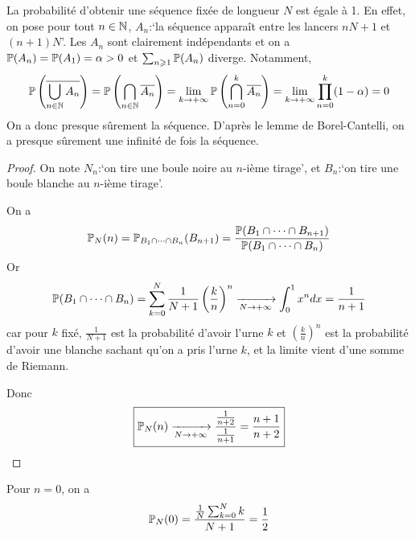 \begin{remark}
    La probabilité d'obtenir une séquence fixée de longueur $N$ est égale à 1. En effet, on pose pour tout $n\in\N$, $A_{n}$:`la séquence apparaît entre les lancers $nN+1$ et $(n+1)N$'. Les $A_{n}$ sont clairement indépendants et on a $\P(A_{n})=\P(A_{1})=\alpha>0$ et $\sum_{n\geqslant1}\P(A_{n})$ diverge. Notamment,
    \begin{equation}
        \P\left(\overline{\bigcup_{n\in\N}A_{n}}\right)=\P\left(\bigcap_{n\in\N}\overline{A_{n}}\right)=\lim\limits_{k\to+\infty}\P\left(\bigcap_{n=0}^{k}\overline{A_{n}}\right)=\lim\limits_{k\to+\infty}\prod_{n=0}^{k}(1-\alpha)=0
    \end{equation}
    On a donc presque sûrement la séquence. D'après le lemme de Borel-Cantelli, on a presque sûrement une infinité de fois la séquence.
\end{remark}

\begin{proof}
    On note $N_{n}$:`on tire une boule noire au $n$-ième tirage', et $B_{n}$:`on tire une boule blanche au $n$-ième tirage'.
    
    On a 
        \begin{equation}
            \P_{N}(n)=\P_{B_{1}\cap\dots\cap B_{n}}(B_{n+1})=\frac{\P(B_{1}\cap\dots\cap B_{n+1})}{\P(B_{1}\cap\dots\cap B_{n})}
        \end{equation}
        Or 
        \begin{equation}
            \P(B_{1}\cap\dots\cap B_{n})=\sum_{k=0}^{N}\frac{1}{N+1}\left(\frac{k}{n}\right)^{n}\xrightarrow[N\to+\infty]{}\int_{0}^{1}x^{n}dx=\frac{1}{n+1}
        \end{equation}
        car pour $k$ fixé, $\frac{1}{N+1}$ est la probabilité d'avoir l'urne $k$ et $\left(\frac{k}{n}\right)^{n}$ est la probabilité d'avoir une blanche sachant qu'on a pris l'urne $k$, et la limite vient d'une somme de Riemann.
        
        Donc 
        \begin{equation}
            \boxed{\P_{N}(n)\xrightarrow[N\to+\infty]{}\frac{\frac{1}{n+2}}{\frac{1}{n+1}}=\frac{n+1}{n+2}}
        \end{equation}
\end{proof}

\begin{remark}
    Pour $n=0$, on a 
    \begin{equation}
        \P_{N}(0)=\frac{\frac{1}{N}\sum_{k=0}^{N}k}{N+1}=\frac{1}{2}
    \end{equation}
\end{remark}

